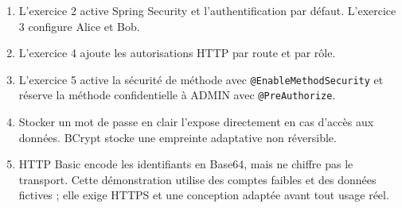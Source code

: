 \documentclass[11pt,a4paper]{article}
\begin{document}
\begin{enumerate}
\item L’exercice 2 active Spring Security et l’authentification par défaut. L’exercice 3 configure Alice et Bob.
\item L’exercice 4 ajoute les autorisations HTTP par route et par rôle.
\item L’exercice 5 active la sécurité de méthode avec \texttt{@EnableMethodSecurity} et réserve la méthode confidentielle à ADMIN avec \texttt{@PreAuthorize}.
\item Stocker un mot de passe en clair l’expose directement en cas d’accès aux données. BCrypt stocke une empreinte adaptative non réversible.
\item HTTP Basic encode les identifiants en Base64, mais ne chiffre pas le transport. Cette démonstration utilise des comptes faibles et des données fictives ; elle exige HTTPS et une conception adaptée avant tout usage réel.
\end{enumerate}
\end{document}
